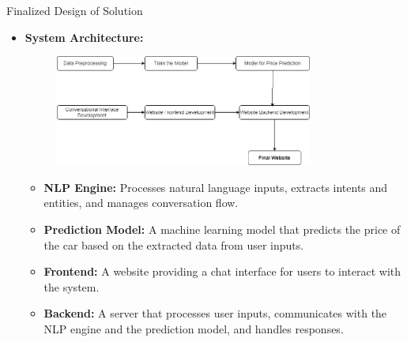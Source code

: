 \documentclass{beamer}
\begin{document}
\begin{frame}[t]{Finalized Design of Solution}
    \begin{itemize}
        \item \textbf{System Architecture:}
	\begin{figure}[htbp]
        \centering
        \includegraphics[width=0.8\textwidth]{Flowchart2.png}
    \end{figure}
        \begin{itemize}
            \item \textbf{NLP Engine:} Processes natural language inputs, extracts intents and entities, and manages conversation flow.
            \item \textbf{Prediction Model:} A machine learning model that predicts the price of the car based on the extracted data from user inputs.
            \item \textbf{Frontend:} A website providing a chat interface for users to interact with the system.
            \item \textbf{Backend:} A server that processes user inputs, communicates with the NLP engine and the prediction model, and handles responses.

        \end{itemize}
    \end{itemize}

	
\end{frame}
\end{document}
